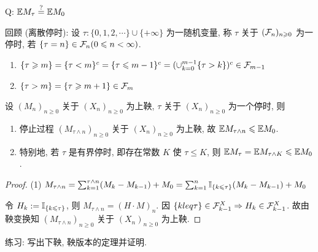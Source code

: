 Q: $\mathbb E M_{\tau}\overset{?}{=}\mathbb E M_0$

回顾 (离散停时): 设 $\tau: \{0,1,2,\cdots\}\cup \{+\infty\}$ 为一随机变量, 称 $\tau$ 关于 $(\mathcal{F}_n)_{n\geqslant 0}$ 为一停时, 若 $\{\tau=n\}\in \mathcal{F}_n(0\leqslant n<\infty)$.

\begin{property}
\begin{enumerate}
    \item $\{\tau \geqslant m\}=\{\tau <m\}^c=\{\tau\leqslant m-1\}^c=(\cup_{k=0}^{m-1}\{\tau >k\})^c\in \mathcal{F}_{m-1}$
    \item $\{\tau >m\}=\{\tau\geqslant m+1\}\in \mathcal{F}_m$
\end{enumerate}
\end{property}

\begin{theorem}[可选停时定理]
    设 $(M_n)_{n\geq 0}$ 关于 $(X_n)_{n\geq 0}$ 为上鞅, $\tau$ 关于 $(X_n)_{n\geq 0}$ 为一个停时, 则
    \begin{enumerate}
        \item 停止过程 $(M_{\tau\land n})_{n\geq 0}$ 关于 $(X_n)_{n\geq 0}$ 为上鞅, 故 $\mathbb E M_{\tau\land n}\leqslant \mathbb E M_0$.
        \item 特别地, 若 $\tau$ 是有界停时, 即存在常数 $K$ 使 $\tau\leq K$, 则 $\mathbb E M_{\tau}=\mathbb E M_{\tau\land K}\leqslant \mathbb E M_0$.
    \end{enumerate}
\end{theorem}

\begin{proof}
    (1) $M_{\tau\land n}=\sum_{k=1}^{\tau\land n}(M_k-M_{k-1})+M_0=\sum_{k=1}^n \mathbb I_{\{k\leqslant \tau\}}(M_k-M_{k-1})+M_0$

    令 $H_k:=\mathbb I_{\{k\leqslant \tau\}}$, 则 $M_{\tau\land n}=(H\cdot M)_n$. 因 $\{k
    leq \tau\}\in \mathcal{F}_{k-1}^X\Rightarrow H_k\in \mathcal{F}_{k-1}^X$. 故由鞅变换知 $(M_{\tau\land n})_{n\geq 0}$ 关于 $(X_n)_{n\geq 0}$ 为上鞅.
\end{proof}

练习: 写出下鞅, 鞅版本的定理并证明.